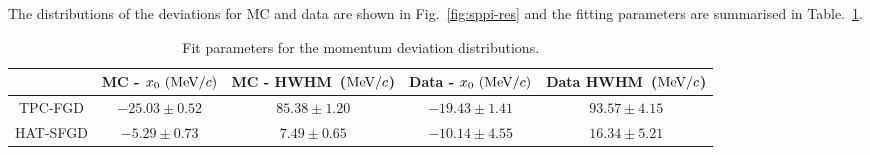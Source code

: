           The distributions of the deviations for MC and data are shown in Fig.~\ref{fig:sppi-res} and the fitting parameters are summarised in Table.~\ref{tab:sppi-res}.

          \begin{table}[htbp]
          \centering
          \begin{tabular}{c|cccc}
                       & MC - $x_0~(\textrm{MeV}/c)$ & MC - HWHM~($\textrm{MeV}/c$) & Data - $x_0~(\textrm{MeV}/c)$ & Data HWHM~($\textrm{MeV}/c$)\\
          \hline
          TPC-FGD & $-25.03 \pm 0.52$ & $85.38 \pm 1.20$ & $-19.43 \pm 1.41$ & $93.57 \pm 4.15$ \\
          HAT-SFGD & $-5.29 \pm 0.73$  & $7.49 \pm 0.65$  & $-10.14 \pm 4.55$  & $16.34 \pm 5.21$ \\
          \end{tabular}
          \caption{Fit parameters for the momentum deviation distributions.}
          \label{tab:sppi-res}
          \end{table}

